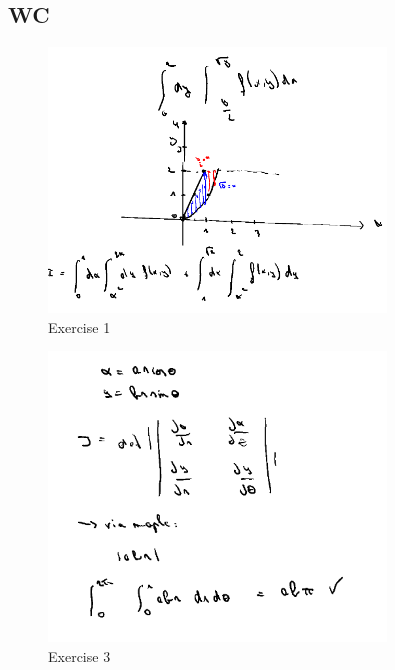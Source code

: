 \documentclass[a4paper]{report}
\begin{document}


\subsection{WC}

\begin{figure}[H]
	\centering
	\includegraphics[width=0.8\textwidth]{assets/wc_5_ex_1.png}
	\caption{Exercise 1}
	\label{fig:wc_5_ex_1}
\end{figure}

\begin{figure}[H]
	\centering
	\includegraphics[width=0.8\textwidth]{assets/wc_5_ex_3.png}
	\caption{Exercise 3}
	\label{fig:wc_5_ex_3}
\end{figure}
\end{document}

